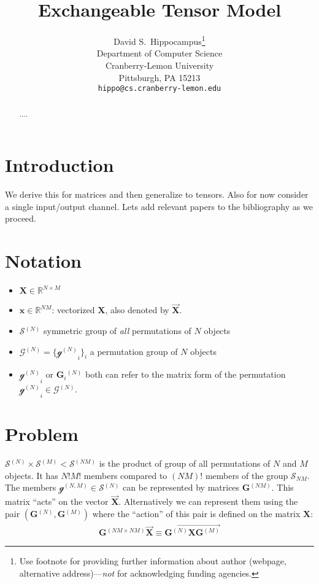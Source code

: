 \documentclass{article}
\title{Exchangeable Tensor Model}
\author{
  David S.~Hippocampus\thanks{Use footnote for providing further
    information about author (webpage, alternative
    address)---\emph{not} for acknowledging funding agencies.} \\
  Department of Computer Science\\
  Cranberry-Lemon University\\
  Pittsburgh, PA 15213 \\
  \texttt{hippo@cs.cranberry-lemon.edu} \\
}
\newcommand{\mat}[1]{\ensuremath{\mathbf{#1}}}
\newcommand{\gr}[1]{\ensuremath{\mathcal{#1}}}
\newcommand{\set}[1]{\ensuremath{\mathbb{#1}}}
\renewcommand{\vec}[1]{\ensuremath{\overrightarrow{#1}}}
\newcommand{\prm}[1]{\ensuremath{^{(#1)}}}
\newcommand{\grn}[2]{\ensuremath{\gr{#1}\prm{#2}}}
\newcommand{\XX}[0]{\ensuremath{\mat{X}}}
\newcommand{\xx}[0]{\ensuremath{\mat{x}}}
\renewcommand{\Re}[0]{\ensuremath{\set{R}}}
\theoremstyle{definition}
\begin{document}

\maketitle

\begin{abstract}
....
\end{abstract}
\section{Introduction}
We derive this for matrices and then generalize to tensors.
Also for now consider a single input/output channel.
Lets add relevant papers to the bibliography as we proceed.

\section{Notation}
\begin{itemize}
\item $\XX \in \Re^{N \times M}$
\item $\xx \in \Re^{N M}$: vectorized $\XX$, also denoted by $\vec{\XX}$.
\item $\grn{S}{N}$ symmetric group of \textit{all} permutations of $N$ objects
\item $\grn{G}{N} = \{\grn{g}{N}_i\}_i$ a permutation group of $N$ objects 
\item $\grn{g}{N}_i$ or $\mat{G}_i\prm{N}$ both can refer to the matrix form of the permutation $\grn{g}{N}_i \in \grn{G}{N}$.
\end{itemize}

\section{Problem}
$\grn{S}{N} \times \grn{S}{M} < \grn{S}{N M}$ is the product of group of all permutations of $N$ and $M$ objects. It has $N! M!$ members compared to $(NM)!$ members of the group $\gr{S}_{N M}$.
The members $\grn{g}{N,M} \in \grn{S}{N}$ can be represented by matrices $\mat{G}\prm{N M}$. This matrix ``acts'' on the vector $\vec{\XX}$.
Alternatively we can represent them using the pair $(\mat{G}\prm{N}, \mat{G}\prm{M})$ where the ``action'' of this pair is defined on the matrix $\XX$:
\begin{align*}
  \mat{G}\prm{N M \times N M} \vec{\XX} \equiv \vec{\mat{G}\prm{N} \XX \mat{G}\prm{M}}
\end{align*}
\end{document}

